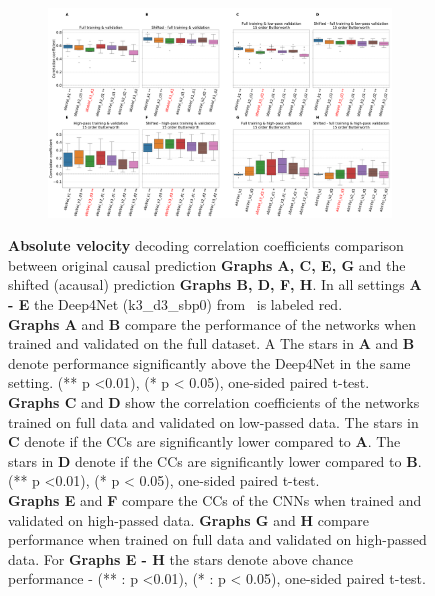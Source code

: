 \begin{figure}[!htbp]\ContinuedFloat
\begin{subfigure}[t]{\textwidth}
   \includegraphics[width=1\linewidth]{img/ch4/shifted_vs_non_shifted_absVel_performance_comparison}
   \caption{}
   \label{fig:shifted-performance-absVel}
\end{subfigure}
\caption[]{{\textbf{Absolute velocity} decoding correlation coefficients comparison between original causal prediction \textbf{Graphs A, C, E, G} and the shifted (acausal) prediction \textbf{Graphs B, D, F, H}. In all settings \textbf{
   A - E} the Deep4Net (k3\_d3\_sbp0) from~\cite{Hammer-2021} is labeled red.\\ \textbf{Graphs A} and \textbf{B} compare the performance of the networks when trained and validated on the full dataset. A The stars in \textbf{A} and \textbf{B} denote performance significantly above the Deep4Net in the same setting. (** p <0.01), (* p < 0.05), one-sided paired t-test.
   \\\textbf{Graphs C} and \textbf{D} show the correlation coefficients of the networks trained on full data and validated on low-passed data. 
   The stars in \textbf{C} denote if the CCs are significantly lower compared to \textbf{A}. The stars in \textbf{D} denote if the CCs are significantly lower compared to \textbf{B}. (** p <0.01), (* p < 0.05), one-sided paired t-test.
   \\\textbf{Graphs E} and \textbf{F} compare the CCs of the CNNs when trained and validated on high-passed data. \textbf{Graphs G} and \textbf{H} compare performance when trained on full data and validated on high-passed data. For \textbf{Graphs E - H} the stars denote above chance performance - (** : p <0.01), (* : p < 0.05), one-sided paired t-test.}}
   \label{fig:shifted-performance}
\end{figure}

